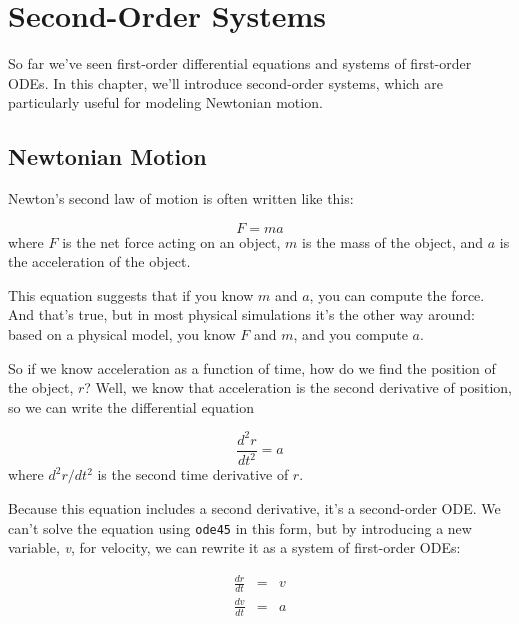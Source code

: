 \chapter{Second-Order Systems}


So far we've seen first-order differential equations and systems of first-order ODEs.  In this chapter, we'll introduce second-order systems, which are particularly useful for modeling Newtonian motion.


\section{Newtonian Motion}

Newton's second law of motion is often written like this:

\begin{equation*}
    F = m a
\end{equation*}
where $F$ is the net force acting on an object, $m$ is the
mass of the object, and $a$ is the acceleration of the object.

This equation suggests
that if you know $m$ and $a$, you can compute the force. And that's true,
but in most physical simulations it's the other way around: based on a
physical model, you know $F$ and $m$, and you compute $a$.


So if we know acceleration as a function of time, how do we
find the position of the object, $r$?  Well, we know that acceleration
is the second derivative of position, so we can write the differential
equation

\begin{equation*}
    \frac{d^2r}{dt^2} = a
\end{equation*}
where ${d^2r}/{dt^2}$ is the second time derivative of $r$.

Because this equation includes a second derivative, it's
a second-order ODE.  We can't solve the equation using \lstinline{ode45} in this form, but
by introducing a new variable, \emph{v}, for velocity, we can rewrite it
as a system of first-order ODEs:

\begin{eqnarray*}
    \frac{dr}{dt} &=& v   \\
    \frac{dv}{dt} &=& a
\end{eqnarray*}

